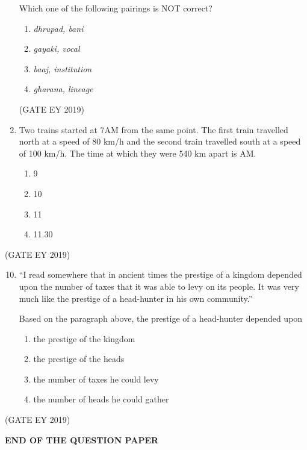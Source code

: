 \documentclass[journal,12pt,onecolumn]{IEEEtran}
\theoremstyle{remark}
\begin{document}
\begin{enumerate}
    Which one of the following pairings is NOT correct?  
    \
    \begin{enumerate}
        \item \textit{dhrupad, bani}
        \item \textit{gayaki, vocal}
        \item \textit{baaj, institution}
        \item \textit{gharana, lineage}
    \end{enumerate}
    \hfill{(GATE EY 2019)}
    
    \item Two trains started at 7AM from the same point. The first train travelled north at a speed of 80 km/h and the second train travelled south at a speed of 100 km/h. The time at which they were 540 km apart is \underline{\hspace{1.5cm}} AM.  
    \begin{multicols}{4}
    \begin{enumerate}
        \item 9
        \item 10
        \item 11
        \item 11.30
    \end{enumerate}
    \end{multicols}
\end{enumerate}\hfill{(GATE EY 2019)}

\begin{enumerate}
    \setcounter{enumi}{9} 
    \item ``I read somewhere that in ancient times the prestige of a kingdom depended upon the number of taxes that it was able to levy on its people. It was very much like the prestige of a head-hunter in his own community.''

    Based on the paragraph above, the prestige of a head-hunter depended upon \underline{\hspace{2cm}}  

    
    \begin{enumerate}
        \item the prestige of the kingdom
        \item the prestige of the heads
        \item the number of taxes he could levy
        \item the number of heads he could gather
    \end{enumerate}
    
   
\end{enumerate}
\hfill{(GATE EY 2019)}
\begin{center}
    \textbf{END OF THE QUESTION PAPER}
\end{center}
\end{document}
